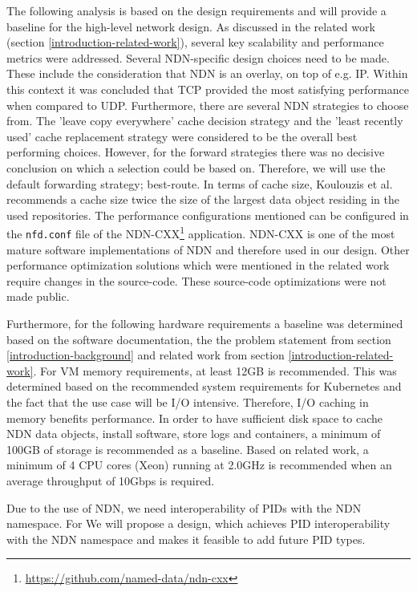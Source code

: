 The following analysis is based on the design requirements and will provide a baseline for the high-level network design. As discussed in the related work (section \ref{introduction-related-work}), several key scalability and performance metrics were addressed. Several NDN-specific design choices need to be made. These include the consideration that NDN is an overlay, on top of e.g. IP. Within this context it was concluded that TCP provided the most satisfying performance when compared to UDP. Furthermore, there are several NDN strategies to choose from. The 'leave copy everywhere' cache decision strategy and the 'least recently used' cache replacement strategy were considered to be the overall best performing choices. However, for the forward strategies there was no decisive conclusion on which a selection could be based on. Therefore, we will use the default forwarding strategy; best-route. In terms of cache size, Koulouzis et al. recommends a cache size twice the size of the largest data object residing in the used repositories. The performance configurations mentioned can be configured in the \texttt{nfd.conf} file of the NDN-CXX\footnote{\url{https://github.com/named-data/ndn-cxx}} application. NDN-CXX is one of the most mature software implementations of NDN and therefore used in our design. Other performance optimization solutions which were mentioned in the related work require changes in the source-code. These source-code optimizations were not made public.

Furthermore, for the following hardware requirements a baseline was determined based on the software documentation, the the problem statement from section \ref{introduction-background} and related work from section \ref{introduction-related-work}. For VM memory requirements, at least 12GB is recommended. This was determined based on the recommended system requirements for Kubernetes \cite{kubernetes-system-requirements} and the fact that the use case will be I/O intensive. Therefore, I/O caching in memory benefits performance. In order to have sufficient disk space to cache NDN data objects, install software, store logs and containers, a minimum of 100GB of storage is recommended as a baseline. Based on related work, a minimum of 4 CPU cores (Xeon) running at 2.0GHz is recommended when an average throughput of 10Gbps is required.

%

Due to the use of NDN, we need interoperability of PIDs with the NDN namespace. For 
We will propose a design, which achieves PID interoperability with the NDN namespace and makes it feasible to add future PID types.



